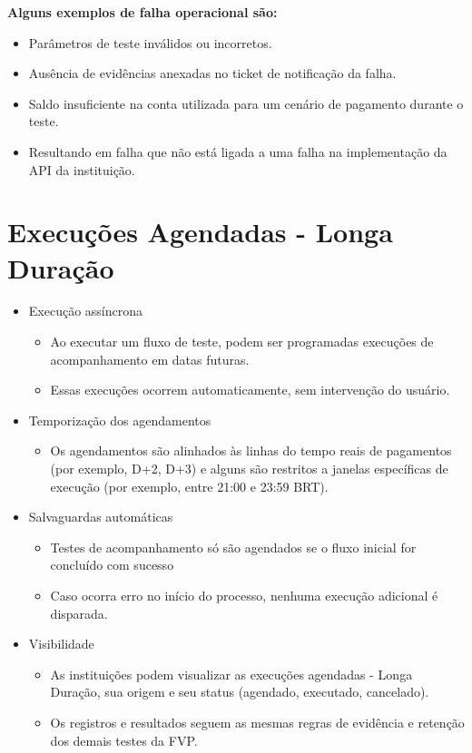 \begin{itemize}
\begin{itemize}
        \textbf{Alguns exemplos de falha operacional são:}
        
        \begin{itemize}
            \item Parâmetros de teste inválidos ou incorretos.
            \item Ausência de evidências anexadas no ticket de notificação da falha.
            \item Saldo insuficiente na conta utilizada para um cenário de pagamento durante o teste.
            \item Resultando em falha que não está ligada a uma falha na implementação da API da instituição.
        \end{itemize}
    \end{itemize}
\end{itemize}

\section{Execuções Agendadas - Longa Duração}

\begin{itemize}
    \item Execução assíncrona
        \begin{itemize}
            \item Ao executar um fluxo de teste, podem ser programadas execuções de acompanhamento em datas futuras. 
            \item Essas execuções ocorrem automaticamente, sem intervenção do usuário.
        \end{itemize}
    \item Temporização dos agendamentos
        \begin{itemize}
            \item Os agendamentos são alinhados às linhas do tempo reais de pagamentos (por exemplo, D+2, D+3) e alguns são restritos a janelas específicas de execução (por exemplo, entre 21:00 e 23:59 BRT).
        \end{itemize}
    \item Salvaguardas automáticas
        \begin{itemize}
            \item  Testes de acompanhamento só são agendados se o fluxo inicial for concluído com sucesso
            \item Caso ocorra erro no início do processo, nenhuma execução adicional é disparada.
        \end{itemize}
    \item Visibilidade
        \begin{itemize}
            \item As instituições podem visualizar as execuções agendadas - Longa Duração, sua origem e seu status (agendado, executado, cancelado).
            \item  Os registros e resultados seguem as mesmas regras de evidência e retenção dos demais testes da FVP.
        \end{itemize}
\end{itemize}

